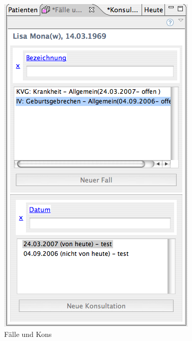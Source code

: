 \begin{figure}[htp]
\begin{center}
  \includegraphics{images/fallkonsview}
  \caption{Fälle und Kons}
  \label{fig:fallkons}
\end{center}
\end{figure}

